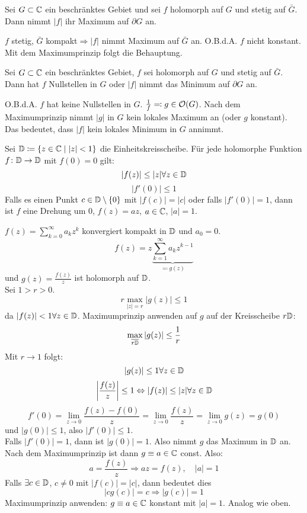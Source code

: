 \begin{satz}
	Sei $ G\subset\mathbb{C} $ ein beschr\"anktes Gebiet und sei $ f $ holomorph auf $ G $ und stetig auf $ \bar G $. Dann nimmt $ |f| $ ihr Maximum auf $ \partial G $ an.
\end{satz}
\begin{beweis}
	$ f $ stetig, $ \bar G $ kompakt$ \Rightarrow |f| $ nimmt Maximum auf $ \bar G $ an. O.B.d.A. $ f $ nicht konstant. Mit dem Maximumprinzip folgt die Behauptung.
\end{beweis}
\begin{satz}[Minimumprinzip]
	Sei $ G\subset\mathbb{C} $ ein beschr\"anktes Gebiet, $ f $ sei holomorph auf $ G $ und stetig auf $ \bar G $. Dann hat $ f $ Nullstellen in $ G $ oder $ |f| $ nimmt das Minimum auf $ \partial G $ an.
\end{satz}
\begin{beweis}
	O.B.d.A. $ f $ hat keine Nullstellen in $ G $. $ \frac{1}{f}\eqqcolon g\in\mathcal O(G) $. Nach dem Maximumprinzip nimmt $ |g| $ in $ G $ kein lokales Maximum an (oder $ g $ konstant). Das bedeutet, dass $ |f| $ kein lokales Minimum in $ G $ annimmt.
\end{beweis}
\newpage
\begin{satz}
	Sei $ \mathbb{D}\coloneqq\lbrace z\in\mathbb{C}\mid |z|<1\rbrace $ die Einheitskreisscheibe. F\"ur jede holomorphe Funktion $ f\colon\mathbb{D}\rightarrow\mathbb{D} $ mit $ f(0)=0 $ gilt:
	\[ |f(z)|\leq |z|\forall z\in\mathbb{D} \]
	\[ |f'(0)|\leq 1 \]
	Falls es einen Punkt $ c\in\mathbb{D}\setminus\lbrace 0\rbrace $ mit $ |f(c)|=|c| $ oder falls $ |f'(0)|=1 $, dann ist $ f $ eine Drehung um $ 0 $, $ f(z)=az $, $ a\in\mathbb{C} $, $ |a|=1 $. 
\end{satz}
\begin{beweis}
	$ f(z)=\sum_{k=0}^\infty a_kz^k $ konvergiert kompakt in $ \mathbb{D} $ und $ a_0=0 $.
	\[ f(z)=z\underbrace{\sum_{k=1}^\infty a_kz^{k-1}}_{\eqqcolon g(z)} \]
	und $ g(z)=\frac{f(z)}{z} $ ist holomorph auf $ \mathbb{D} $.\\
	Sei $ 1>r>0 $.
	\[ r\max_{|z|=r}|g(z)|\leq 1 \]
	da $ |f(z)|<1\forall z\in\mathbb{D} $. Maximumprinzip anwenden auf $ g $ auf der Kreisscheibe $ r\mathbb{D} $:
	\[ \max_{\overline{r\mathbb{D}}}|g(z)|\leq\frac{1}{r} \]
	Mit $ r\to 1 $ folgt: \[ |g(z)|\leq 1\forall z\in\mathbb{D} \]
	\[ \left|\frac{f(z)}{z}\right|\leq 1\Leftrightarrow|f(z)|\leq|z|\forall z\in\mathbb{D} \]
	\[ f'(0)=\lim_{z\to 0}\frac{f(z)-f(0)}{z}=\lim_{z\to 0}\frac{f(z)}{z}=\lim_{z\to 0}g(z)=g(0) \]
	und $ |g(0)|\leq 1 $, also $ |f'(0)|\leq 1 $.\\
	Falls $ |f'(0)|=1 $, dann ist $|g(0)|=1 $. Also nimmt $ g $ das Maximum in $ \mathbb{D} $ an. Nach dem Maximumprinzip ist dann $ g\equiv a\in\mathbb{C} $ const. Also:
	\[ a=\frac{f(z)}{z}\Rightarrow az=f(z),\quad |a|=1 \]
	Falls $ \exists c\in\mathbb{D} $, $ c\neq 0 $ mit $ |f(c)|=|c| $, dann bedeutet dies
	\[ |cg(c)|=c\Rightarrow |g(c)|=1 \]
	Maximumprinzip anwenden: $ g\equiv a\in\mathbb{C} $ konstant mit $ |a|=1 $. Analog wie oben. 
\end{beweis}
